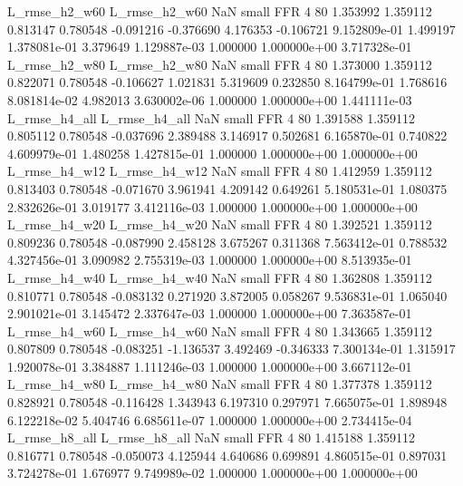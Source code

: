  L_rmse_h2_w60  L_rmse_h2_w60                   NaN      small      FFR                 4 80 1.353992       1.359112 0.813147       0.780548   -0.091216     -0.376690      4.176353    -0.106721   9.152809e-01  1.499197 1.378081e-01     3.379649   1.129887e-03            1.000000    1.000000e+00        3.717328e-01
 L_rmse_h2_w80  L_rmse_h2_w80                   NaN      small      FFR                 4 80 1.373000       1.359112 0.822071       0.780548   -0.106627      1.021831      5.319609     0.232850   8.164799e-01  1.768616 8.081814e-02     4.982013   3.630002e-06            1.000000    1.000000e+00        1.441111e-03
 L_rmse_h4_all  L_rmse_h4_all                   NaN      small      FFR                 4 80 1.391588       1.359112 0.805112       0.780548   -0.037696      2.389488      3.146917     0.502681   6.165870e-01  0.740822 4.609979e-01     1.480258   1.427815e-01            1.000000    1.000000e+00        1.000000e+00
 L_rmse_h4_w12  L_rmse_h4_w12                   NaN      small      FFR                 4 80 1.412959       1.359112 0.813403       0.780548   -0.071670      3.961941      4.209142     0.649261   5.180531e-01  1.080375 2.832626e-01     3.019177   3.412116e-03            1.000000    1.000000e+00        1.000000e+00
 L_rmse_h4_w20  L_rmse_h4_w20                   NaN      small      FFR                 4 80 1.392521       1.359112 0.809236       0.780548   -0.087990      2.458128      3.675267     0.311368   7.563412e-01  0.788532 4.327456e-01     3.090982   2.755319e-03            1.000000    1.000000e+00        8.513935e-01
 L_rmse_h4_w40  L_rmse_h4_w40                   NaN      small      FFR                 4 80 1.362808       1.359112 0.810771       0.780548   -0.083132      0.271920      3.872005     0.058267   9.536831e-01  1.065040 2.901021e-01     3.145472   2.337647e-03            1.000000    1.000000e+00        7.363587e-01
 L_rmse_h4_w60  L_rmse_h4_w60                   NaN      small      FFR                 4 80 1.343665       1.359112 0.807809       0.780548   -0.083251     -1.136537      3.492469    -0.346333   7.300134e-01  1.315917 1.920078e-01     3.384887   1.111246e-03            1.000000    1.000000e+00        3.667112e-01
 L_rmse_h4_w80  L_rmse_h4_w80                   NaN      small      FFR                 4 80 1.377378       1.359112 0.828921       0.780548   -0.116428      1.343943      6.197310     0.297971   7.665075e-01  1.898948 6.122218e-02     5.404746   6.685611e-07            1.000000    1.000000e+00        2.734415e-04
 L_rmse_h8_all  L_rmse_h8_all                   NaN      small      FFR                 4 80 1.415188       1.359112 0.816771       0.780548   -0.050073      4.125944      4.640686     0.699891   4.860515e-01  0.897031 3.724278e-01     1.676977   9.749989e-02            1.000000    1.000000e+00        1.000000e+00

